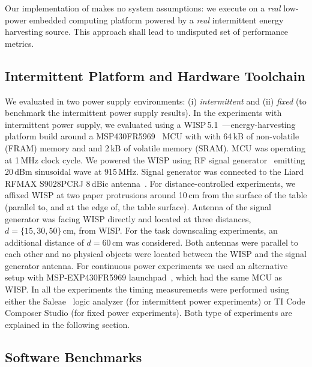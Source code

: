 Our implementation of \sys makes no system assumptions: we execute \sys on a \emph{real} low-power embedded computing platform powered by a \emph{real} intermittent energy harvesting source. This approach shall lead to undisputed set of \sys performance metrics. 

\subsection{Intermittent Platform and Hardware Toolchain}
\label{sec:results_hardware_software}

We evaluated \sys in two power supply environments: (i)  \emph{intermittent} and (ii) \emph{fixed} (to benchmark the intermittent power supply results). In the experiments with intermittent power supply, we evaluated \sys using a WISP\,5.1~\cite{wisp5,wisp}---energy-harvesting platform build around a MSP430FR5969~\cite{wolverine} MCU with with 64\,kB of non-volatile (FRAM) memory and and 2\,kB of volatile memory (SRAM). MCU was operating at 1\,MHz clock cycle. We powered the WISP using RF signal generator~\cite{}  emitting 20\,dBm sinusoidal wave at 915\,MHz.  Signal generator was connected to the Liard RFMAX S9028PCRJ 8\,dBic antenna~\cite{atlas2015}. For distance-controlled experiments, we affixed WISP at two paper protrusions around 10\,cm from the surface of the table (parallel to, and at the edge of, the table surface). Antenna of the signal generator was facing WISP directly and located at three distances, $d=\{15, 30, 50\}$\,cm, from WISP. For the task downscaling experiments, an additional distance of $d=60$\,cm was considered. Both antennas were parallel to each other and no physical objects were located between the WISP and the signal generator antenna. For continuous power experiments we used an alternative setup with MSP-EXP430FR5969 launchpad~\cite{MSP-EXP430FR5969_launchpad}, which had the same MCU as WISP. In all the experiments the timing measurements were performed using either the Saleae~\cite{saleae} logic analyzer (for intermittent power experiments) or TI Code Composer Studio (for fixed power experiments).  Both type of experiments are explained in the following section.

\subsection{Software Benchmarks}
\label{sec:software_benchmarks}

